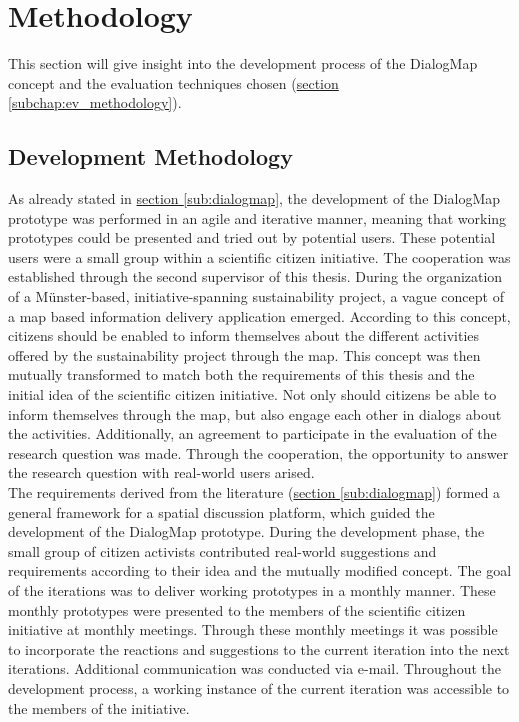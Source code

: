 \section{Methodology}
\label{chap:methodology}
This section will give insight into the development process of the DialogMap concept and the evaluation techniques chosen (\hyperref[subchap:ev_methodology]{section \ref{subchap:ev_methodology}}).

\subsection{Development Methodology}
As already stated in \hyperref[sub:dialogmap]{section \ref{sub:dialogmap}}, the development of the DialogMap prototype was performed in an agile and iterative manner, meaning that working prototypes could be presented and tried out by potential users. These potential users were a small group within a scientific citizen initiative. The cooperation was established through the second supervisor of this thesis. During the organization of a Münster-based, initiative-spanning sustainability project, a vague concept of a map based information delivery application emerged. According to this concept, citizens should be enabled to inform themselves about the different activities offered by the sustainability project through the map. This concept was then mutually transformed to match both the requirements of this thesis and the initial idea of the scientific citizen initiative. Not only should citizens be able to inform themselves through the map, but also engage each other in dialogs about the activities. Additionally, an agreement to participate in the evaluation of the research question was made. Through the cooperation, the opportunity to answer the research question with real-world users arised.\\
The requirements derived from the literature (\hyperref[sub:dialogmap]{section \ref{sub:dialogmap}}) formed a general framework for a spatial discussion platform, which guided the development of the DialogMap prototype. During the development phase, the small group of citizen activists contributed real-world suggestions and requirements according to their idea and the mutually modified concept. The goal of the iterations was to deliver working prototypes in a monthly manner. These monthly prototypes were presented to the members of the scientific citizen initiative at monthly meetings. Through these monthly meetings it was possible to incorporate the reactions and suggestions to the current iteration into the next iterations. Additional communication was conducted via e-mail. Throughout the development process, a working instance of the current iteration was accessible to the members of the initiative.\\

